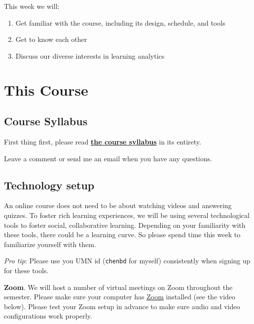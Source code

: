 \documentclass[
]{book}
\providecommand{\tightlist}{%
  \setlength{\itemsep}{0pt}\setlength{\parskip}{0pt}}
\begin{document}
This week we will:

\begin{enumerate}
\def\labelenumi{\arabic{enumi}.}
\tightlist
\item
  Get familiar with the course, including its design, schedule, and tools
\item
  Get to know each other
\item
  Discuss our diverse interests in learning analytics
\end{enumerate}

\hypertarget{this-course}{%
\section{This Course}\label{this-course}}

\hypertarget{course-syllabus}{%
\subsection{Course Syllabus}\label{course-syllabus}}

First thing first, please read \href{https://docs.google.com/document/d/1Y8kx_7IgM4sL9zvuG729uG6oo9p_BOxtUiNyGcDL-f8/edit?usp=sharing}{\textbf{the course syllabus}} in its entirety.

Leave a comment or send me an email when you have any questions.

\hypertarget{technology-setup}{%
\subsection{Technology setup}\label{technology-setup}}

An online course does not need to be about watching videos and answering quizzes. To foster rich learning experiences, we will be using several technological tools to foster social, collaborative learning. Depending on your familiarity with these tools, there could be a learning curve. So please spend time this week to familiarize yourself with them.

\emph{Pro tip}: Please use you UMN id (\texttt{chenbd} for myself) consistently when signing up for these tools.

\textbf{Zoom}. We will host a number of virtual meetings on Zoom throughout the semester. Please make sure your computer has \href{https://zoom.us/}{Zoom} installed (see the video below). Please test your Zoom setup in advance to make sure audio and video configurations work properly.
\end{document}
